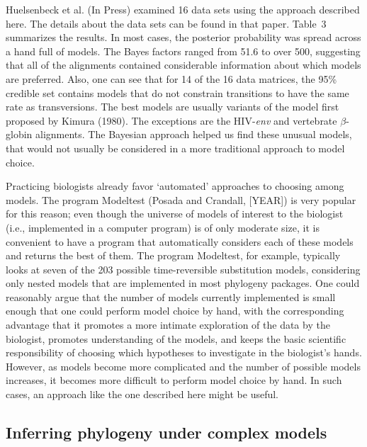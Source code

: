 \documentclass{svmult}
\begin{document}
Huelsenbeck et al. (In Press) examined 16 data sets using the approach described here. The details about the data sets can be found in that paper. Table~3 summarizes
the results. In most cases, the posterior probability was spread across a hand full of models. The Bayes factors ranged from 51.6 to over 500, suggesting that all of the
alignments contained considerable information about which models are preferred. 
Also, one can see that for 14 of the 16 data matrices, the 95\% credible
set contains models that do not constrain transitions to have the same rate as transversions. The best models are usually variants of the model first proposed by Kimura (1980).
The exceptions are the HIV-{\it env} and vertebrate $\beta$-globin alignments. The Bayesian approach helped us find these unusual models, that would not usually be considered
in a more traditional approach to model choice.

Practicing biologists already favor `automated' approaches to choosing among models. The program Modeltest (Posada and Crandall, [YEAR]) is very popular for this
reason; even though the universe of models of interest to the biologist (i.e., implemented in a computer program) is of only moderate size, it is convenient to have a program
that automatically considers each of these models and returns the best of them. The program Modeltest, for example, typically looks at seven of the 203 possible time-reversible
substitution models, considering only nested models that are implemented in most phylogeny packages. One could reasonably argue that the number of models currently implemented is small enough that one could perform model choice by hand, with
the corresponding advantage that it promotes a more intimate exploration of the data by the biologist, promotes understanding of the models, and keeps the basic scientific
responsibility of choosing which hypotheses to investigate in the biologist's hands. However, as models become more complicated and the number of possible models increases, it becomes
more difficult to perform model choice by hand. In such cases, an approach like the one described here might be useful.

\subsection{Inferring phylogeny under complex models}
\end{document}
